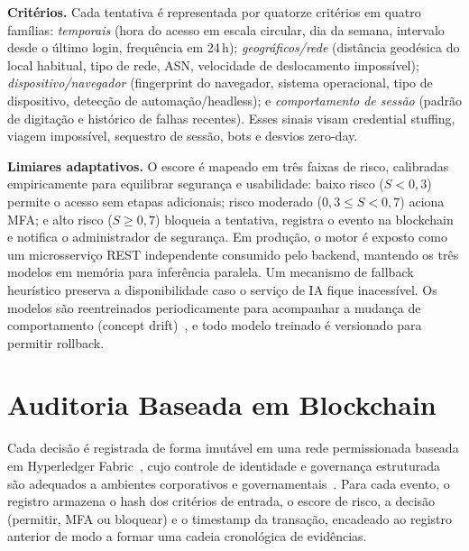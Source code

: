 \documentclass[conference]{IEEEtran}
\begin{document}
\textbf{Critérios.} Cada tentativa é representada por quatorze critérios
em quatro famílias: \emph{temporais} (hora do acesso em escala circular,
dia da semana, intervalo desde o último login, frequência em 24\,h);
\emph{geográficos/rede} (distância geodésica do local habitual, tipo de
rede, ASN, velocidade de deslocamento impossível);
\emph{dispositivo/navegador} (fingerprint do navegador, sistema
operacional, tipo de dispositivo, detecção de automação/headless); e
\emph{comportamento de sessão} (padrão de digitação e histórico de falhas
recentes). Esses sinais visam credential stuffing, viagem impossível,
sequestro de sessão, bots e desvios zero-day.

\textbf{Limiares adaptativos.} O escore é mapeado em três faixas de
risco, calibradas empiricamente para equilibrar segurança e usabilidade:
baixo risco ($S<0{,}3$) permite o acesso sem etapas adicionais; risco
moderado ($0{,}3\le S<0{,}7$) aciona MFA; e alto risco ($S\ge0{,}7$)
bloqueia a tentativa, registra o evento na blockchain e notifica o
administrador de segurança. Em produção, o motor é exposto como um
microsserviço REST independente consumido pelo backend, mantendo os três
modelos em memória para inferência paralela. Um
mecanismo de fallback heurístico preserva a disponibilidade caso o
serviço de IA fique inacessível. Os modelos são reentreinados
periodicamente para acompanhar a mudança de comportamento (concept
drift)~\cite{gama2014}, e todo modelo treinado é versionado para permitir
rollback.

\section{Auditoria Baseada em Blockchain}
\label{sec:bc}
Cada decisão é registrada de forma imutável em uma rede permissionada
baseada em Hyperledger Fabric~\cite{fabric2024}, cujo controle de
identidade e governança estruturada são adequados a ambientes
corporativos e governamentais~\cite{nistir8202}. Para cada evento, o
registro armazena o hash dos critérios de entrada, o escore de risco, a
decisão (permitir, MFA ou bloquear) e o timestamp da transação, encadeado
ao registro anterior de modo a formar uma cadeia cronológica de
evidências.
\end{document}
